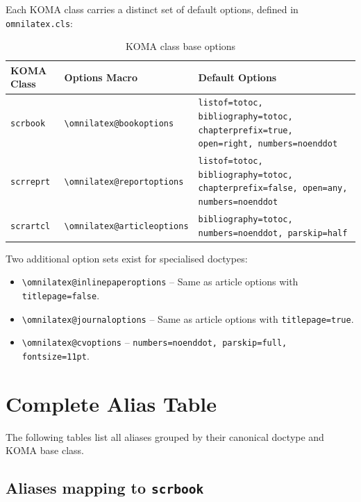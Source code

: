 Each KOMA class carries a distinct set of default options, defined in
\texttt{omnilatex.cls}:

\begin{table}[htbp]
    \centering
    \caption{KOMA class base options}
    \label{tab:koma-base-options}
    \begin{tabular}{@{} l l p{5cm} @{}}
        \toprule
        \textbf{KOMA Class} & \textbf{Options Macro} & \textbf{Default Options} \\
        \midrule
        \texttt{scrbook} &
            \texttt{\textbackslash omnilatex@bookoptions} &
            \texttt{listof=totoc, bibliography=totoc, chapterprefix=true,
            open=right, numbers=noenddot} \\[6pt]
        \texttt{scrreprt} &
            \texttt{\textbackslash omnilatex@reportoptions} &
            \texttt{listof=totoc, bibliography=totoc, chapterprefix=false,
            open=any, numbers=noenddot} \\[6pt]
        \texttt{scrartcl} &
            \texttt{\textbackslash omnilatex@articleoptions} &
            \texttt{bibliography=totoc, numbers=noenddot, parskip=half} \\
        \bottomrule
    \end{tabular}
\end{table}

Two additional option sets exist for specialised doctypes:

\begin{itemize}
    \item \texttt{\textbackslash omnilatex@inlinepaperoptions} -- Same as
          article options with \texttt{titlepage=false}.
    \item \texttt{\textbackslash omnilatex@journaloptions} -- Same as
          article options with \texttt{titlepage=true}.
    \item \texttt{\textbackslash omnilatex@cvoptions} --
          \texttt{numbers=noenddot, parskip=full, fontsize=11pt}.
\end{itemize}

\section{Complete Alias Table}

The following tables list all aliases grouped by their canonical doctype
and KOMA base class.

\subsection{Aliases mapping to \texttt{scrbook}}

